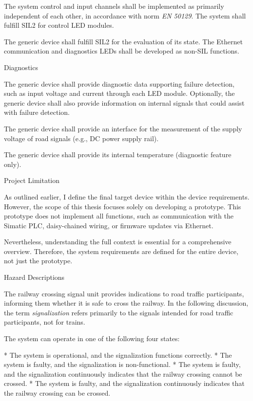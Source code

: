 The system control and input channels shall be implemented as primarily independent of each other, in accordance with norm {\it EN 50129}. The system shall fulfill SIL2 for control LED modules.

The generic device shall fulfill SIL2 for the evaluation of its state. The Ethernet communication and diagnostics LEDs shall be developed as non-SIL functions.

\secc Diagnostics

The generic device shall provide diagnostic data supporting failure detection, such as input voltage and current through each LED module. Optionally, the generic device shall also provide information on internal signals that could assist with failure detection.

The generic device shall provide an interface for the measurement of the supply voltage of road signals (e.g., DC power supply rail).

The generic device shall provide its internal temperature (diagnostic feature only).

\secc Project Limitation

As outlined earlier, I define the final target device within the device requirements. However, the scope of this thesis focuses solely on developing a prototype. This prototype does not implement all functions, such as communication with the Simatic PLC, daisy-chained wiring, or firmware updates via Ethernet.

Nevertheless, understanding the full context is essential for a comprehensive overview. Therefore, the system requirements are defined for the entire device, not just the prototype.

\sec Hazard Descriptions

The railway crossing signal unit provides indications to road traffic participants, informing them whether it is safe to cross the railway. In the following discussion, the term {\it signalization} refers primarily to the signals intended for road traffic participants, not for trains.

The system can operate in one of the following four states:

\begitems
* The {\sbf system is operational}, and the signalization functions correctly.
* The system is faulty, and the {\sbf signalization is non-functional}.
* The system is faulty, and the signalization continuously indicates that the railway crossing {\sbf cannot be crossed}.
* The system is faulty, and the signalization continuously indicates that the railway crossing {\sbf can be crossed}.
\enditems

